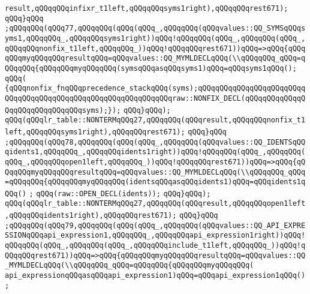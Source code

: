 \verb|result,qQQqqQQqinfixr_t1left,qQQqqQQqsyms1right),qQQqqQQqrest671);|\newline
\verb|qQQq}qQQq|\newline
\verb|;qQQqqQQq(qQQq77,qQQqqQQq(qQQq(qQQq_,qQQqqQQq(qQQqvalues::QQ_SYMSqQQqsyms1,qQQqqQQq_,qQQqqQQqsyms1right))qQQq!qQQqqQQq(qQQq_,qQQqqQQq(qQQq_,qQQqqQQqnonfix_t1left,qQQqqQQq_))qQQq!qQQqqQQqrest671))qQQq=>qQQq{qQQqqQQqmyqQQqqQQqresultqQQq=qQQqvalues::QQ_MYMLDECLqQQq(\\qQQqqQQq_qQQq=qQQqqQQq{qQQqqQQqmyqQQqqQQq(symsqQQqasqQQqsyms1)qQQq=qQQqsyms1qQQq();|\newline
\verb|qQQq(|\newline
\verb|{qQQqnonfix_fnqQQqprecedence_stackqQQq(syms);qQQqqQQqqQQqqQQqqQQqqQQqqQQqqQQqqQQqqQQqqQQqqQQqqQQqqQQqqQQqqQQqraw::NONFIX_DECL(qQQqqQQqqQQqqQQqqQQqqQQqqQQqqQQqsyms);});|\newline
\verb|qQQq}qQQq);|\newline
\verb|qQQq(qQQqlr_table::NONTERMqQQq27,qQQqqQQq(qQQqresult,qQQqqQQqnonfix_t1left,qQQqqQQqsyms1right),qQQqqQQqrest671);|\newline
\verb|qQQq}qQQq|\newline
\verb|;qQQqqQQq(qQQq78,qQQqqQQq(qQQq(qQQq_,qQQqqQQq(qQQqvalues::QQ_IDENTSqQQqidents1,qQQqqQQq_,qQQqqQQqidents1right))qQQq!qQQqqQQq(qQQq_,qQQqqQQq(qQQq_,qQQqqQQqopen1left,qQQqqQQq_))qQQq!qQQqqQQqrest671))qQQq=>qQQq{qQQqqQQqmyqQQqqQQqresultqQQq=qQQqvalues::QQ_MYMLDECLqQQq(\\qQQqqQQq_qQQq=qQQqqQQq{qQQqqQQqmyqQQqqQQq(identsqQQqasqQQqidents1)qQQq=qQQqidents1qQQq()|\newline
\verb|;|\newline
\verb|qQQq(raw::OPEN_DECL(idents));|\newline
\verb|qQQq}qQQq);|\newline
\verb|qQQq(qQQqlr_table::NONTERMqQQq27,qQQqqQQq(qQQqresult,qQQqqQQqopen1left,qQQqqQQqidents1right),qQQqqQQqrest671);|\newline
\verb|qQQq}qQQq|\newline
\verb|;qQQqqQQq(qQQq79,qQQqqQQq(qQQq(qQQq_,qQQqqQQq(qQQqvalues::QQ_API_EXPRESSIONqQQqapi_expression1,qQQqqQQq_,qQQqqQQqapi_expression1right))qQQq!qQQqqQQq(qQQq_,qQQqqQQq(qQQq_,qQQqqQQqinclude_t1left,qQQqqQQq_))qQQq!qQQqqQQqrest671))qQQq=>qQQq{qQQqqQQqmyqQQqqQQqresultqQQq=qQQqvalues::QQ_MYMLDECLqQQq(\\qQQqqQQq_qQQq=qQQqqQQq{qQQqqQQqmyqQQqqQQq(|\newline
\verb|api_expressionqQQqasqQQqapi_expression1)qQQq=qQQqapi_expression1qQQq();|\newline
